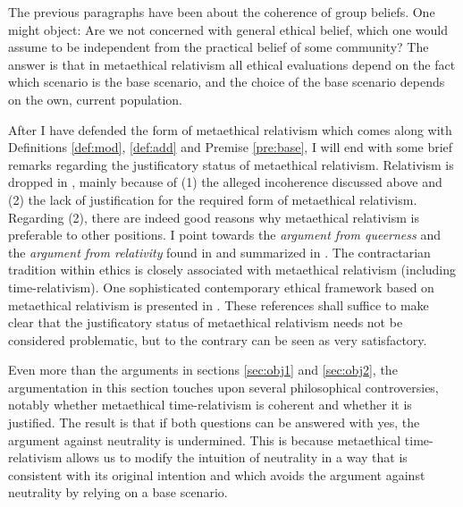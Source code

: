 The previous paragraphs have been about the coherence of group beliefs. One might object: Are we not concerned with general ethical belief, which one would assume to be independent from the practical belief of some community? The answer is that in metaethical relativism all ethical evaluations depend on the fact which scenario is the base scenario, and the choice of the base scenario depends on the own, current population. 

After I have defended the form of metaethical relativism which comes along with Definitions \ref{def:mod}, \ref{def:add} and Premise \ref{pre:base}, I will end with some brief remarks regarding the justificatory status of metaethical relativism. Relativism is dropped in , mainly because of (1) the alleged incoherence discussed above and (2) the lack of justification for the required form of metaethical relativism. Regarding (2), there are indeed good reasons why metaethical relativism is preferable to other positions. I point towards the \emph{argument from queerness} and the \emph{argument from relativity} found in  and summarized in . The contractarian tradition within ethics is closely associated with metaethical relativism (including time-relativism). One sophisticated contemporary ethical framework based on metaethical relativism is presented in . These references shall suffice to make clear that the justificatory status of metaethical relativism needs not be considered problematic, but to the contrary can be seen as very satisfactory. 

Even more than the arguments in sections \ref{sec:obj1} and \ref{sec:obj2}, the argumentation in this section touches upon several philosophical controversies, notably whether metaethical time-relativism is coherent and whether it is justified. The result is that if both questions can be answered with yes, the argument against neutrality is undermined. This is because metaethical time-relativism allows us to modify the intuition of neutrality in a way that is consistent with its original intention and which avoids the argument against neutrality by relying on a base scenario. 